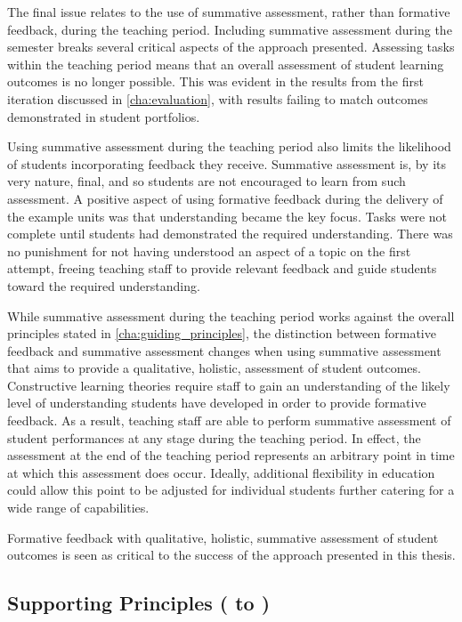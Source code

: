 The final issue relates to the use of summative assessment, rather than formative feedback, during the teaching period. Including summative assessment during the semester breaks several critical aspects of the approach presented. Assessing tasks within the teaching period means that an overall assessment of student learning outcomes is no longer possible. This was evident in the results from the first iteration discussed in \cref{cha:evaluation}, with results failing to match outcomes demonstrated in student portfolios.

Using summative assessment during the teaching period also limits the likelihood of students incorporating feedback they receive. Summative assessment is, by its very nature, final, and so students are not encouraged to learn from such assessment. A positive aspect of using formative feedback during the delivery of the example units was that understanding became the key focus. Tasks were not complete until students had demonstrated the required understanding. There was no punishment for not having understood an aspect of a topic on the first attempt, freeing teaching staff to provide relevant feedback and guide students toward the required understanding.

While summative assessment during the teaching period works against the overall principles stated in \cref{cha:guiding_principles}, the distinction between formative feedback and summative assessment changes when using summative assessment that aims to provide a qualitative, holistic, assessment of student outcomes. Constructive learning theories require staff to gain an understanding of the likely level of understanding students have developed in order to provide formative feedback. As a result, teaching staff are able to perform summative assessment of student performances at any stage during the teaching period. In effect, the assessment at the end of the teaching period represents an arbitrary point in time at which this assessment does occur. Ideally, additional flexibility in education could allow this point to be adjusted for individual students further catering for a wide range of capabilities.

Formative feedback with qualitative, holistic, summative assessment of student outcomes is seen as critical to the success of the approach presented in this thesis.


\subsection{Supporting Principles ( to )} %
\label{sub:supporting_principles}

